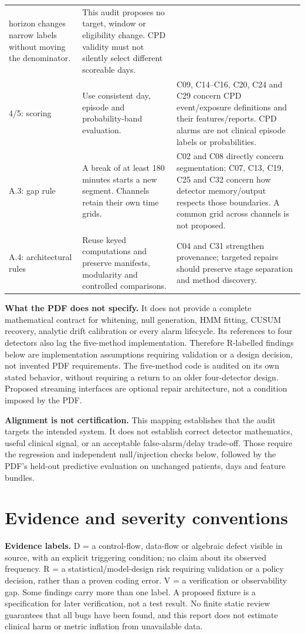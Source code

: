 \documentclass[11pt,a4paper]{article}
\begin{document}
\begin{longtable}{@{}p{}p{}p{}@{}}
horizon changes narrow labels without moving the denominator. & This audit proposes
no target, window or eligibility change. CPD validity must not silently select
different scoreable days. \\
4/5: scoring & Use consistent day, episode and probability-band evaluation. & C09,
C14--C16, C20, C24 and C29 concern CPD event/exposure definitions and their
features/reports. CPD alarms are not clinical episode labels or probabilities. \\
A.3: gap rule & A break of at least 180 minutes starts a new segment. Channels
retain their own time grids. & C02 and C08 directly concern segmentation;
C07, C13, C19, C25 and C32 concern how detector memory/output respects those
boundaries. A common grid across channels is not proposed. \\
A.4: architectural rules & Reuse keyed computations and preserve manifests,
modularity and controlled comparisons. & C04 and C31 strengthen provenance;
targeted repairs should preserve stage separation and method discovery. \\
\bottomrule
\end{longtable}

\textbf{What the PDF does not specify.} It does not provide a complete mathematical
contract for whitening, null generation, HMM fitting, CUSUM recovery, analytic drift
calibration or every alarm lifecycle. Its references to four detectors also lag the
five-method implementation. Therefore R-labelled findings below are implementation
assumptions requiring validation or a design decision, not invented PDF requirements.
The five-method code is audited on its own stated behavior, without requiring a
return to an older four-detector design. Proposed streaming interfaces are optional
repair architecture, not a condition imposed by the PDF.

\textbf{Alignment is not certification.} This mapping establishes that the audit
targets the intended system. It does not establish correct detector mathematics,
useful clinical signal, or an acceptable false-alarm/delay trade-off. Those require
the regression and independent null/injection checks below, followed by the PDF's
held-out predictive evaluation on unchanged patients, days and feature bundles.

\section{Evidence and severity conventions}

\textbf{Evidence labels.} D = a control-flow, data-flow or algebraic defect visible
in source, with an explicit triggering condition; no claim about its observed
frequency. R = a statistical/model-design risk requiring validation or a policy
decision, rather than a proven coding error. V = a verification or observability
gap. Some findings carry more than one label. A proposed fixture is a specification
for later verification, not a test result. No finite static review guarantees that
all bugs have been found, and this report does not estimate clinical harm or metric
inflation from unavailable data.
\end{document}
